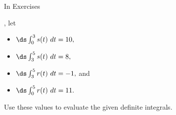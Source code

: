 {\noindent In Exercises }
{, let
\begin{itemize}
\item $\ds \int_0^3 s(t)\ dt = 10,$
\item $\ds \int_3^5 s(t) \ dt=8,$
\item $\ds \int_3^5 r(t)\ dt = -1,$ and
\item $\ds \int_0^5 r(t)\ dt = 11.$
\end{itemize}
Use these values to evaluate the given definite integrals.}
